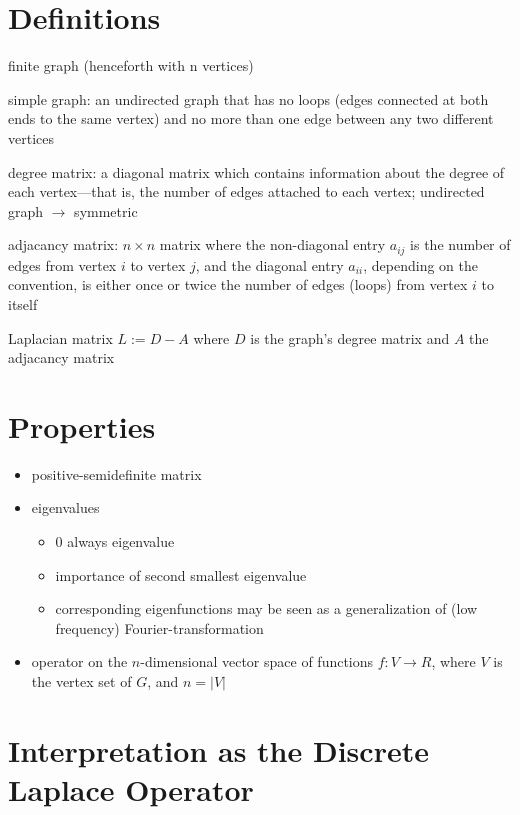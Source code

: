 \section{Definitions}
finite graph (henceforth with n vertices)

simple graph: an undirected graph that has no loops (edges connected at both ends to the same vertex) and no more than one edge between any two different vertices

degree matrix: a diagonal matrix which contains information about the degree of each vertex—that is, the number of edges attached to each vertex; undirected graph $\rightarrow$ symmetric

adjacancy matrix: $n \times n$ matrix where the non-diagonal entry $a_{ij}$ is the number of edges from vertex $i$ to vertex $j$, and the diagonal entry $a_{ii}$, depending on the convention, is either once or twice the number of edges (loops) from vertex $i$ to itself

Laplacian matrix $L:=D-A$ where $D$ is the graph's degree matrix and $A$ the adjacancy matrix

\section{Properties}
\begin{itemize}
    \item positive-semidefinite matrix
    \item eigenvalues
    \begin{itemize}
        \item 0 always eigenvalue
        \item importance of second smallest eigenvalue
        \item corresponding eigenfunctions may be seen as a generalization of (low frequency) Fourier-transformation
    \end{itemize}
    \item operator on the $n$-dimensional vector space of functions $f:V \rightarrow R$, where $V$ is the vertex set of $G$, and $n=|V|$
\end{itemize}


\section{Interpretation as the Discrete Laplace Operator}